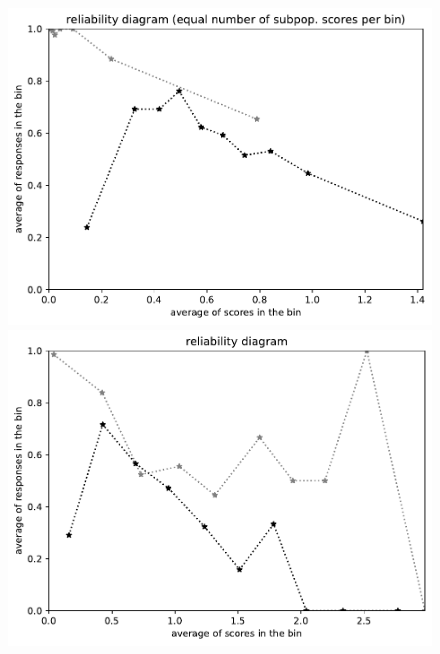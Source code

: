 \documentclass{article}
\newlength{\vertsep}
\newlength{\imsize}
\begin{document}
\begin{figure}
\begin{centering}
\parbox{\imsize}{\includegraphics[width=\imsize]
{../codes/unweighted/nll-1-248-Eskimo-dog-husky_293-cheetah-chetah-Acinonyx-jubatusequisamps10.pdf}}
\quad\quad
\parbox{\imsize}{\includegraphics[width=\imsize]
{../codes/unweighted/nll-1-248-Eskimo-dog-husky_293-cheetah-chetah-Acinonyx-jubatusequiscore10.pdf}}

\vspace{\vertsep}


\end{centering}
\end{figure}
\end{document}
